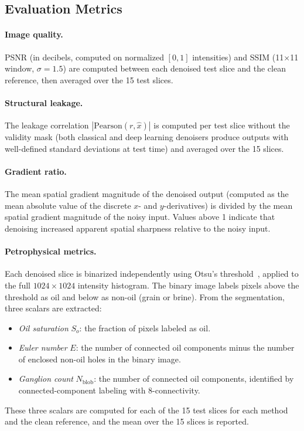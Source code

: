 \documentclass[review,12pt]{elsarticle}
\begin{document}
\subsection{Evaluation Metrics}
\label{sec:methods:eval}

\paragraph{Image quality.}
PSNR (in decibels, computed on normalized $[0, 1]$ intensities) and
SSIM (11$\times$11 window, $\sigma = 1.5$) are computed between each
denoised test slice and the clean reference, then averaged over the 15
test slices.

\paragraph{Structural leakage.}
The leakage correlation $|\mathrm{Pearson}(r, \hat{x})|$ is computed
per test slice without the validity mask (both classical and deep
learning denoisers produce outputs with well-defined standard deviations
at test time) and averaged over the 15 slices.

\paragraph{Gradient ratio.}
The mean spatial gradient magnitude of the denoised output (computed as
the mean absolute value of the discrete $x$- and $y$-derivatives) is
divided by the mean spatial gradient magnitude of the noisy input.
Values above 1 indicate that denoising increased apparent spatial
sharpness relative to the noisy input.

\paragraph{Petrophysical metrics.}
Each denoised slice is binarized independently using Otsu's
threshold~\cite{Otsu1979}, applied to the full $1024 \times 1024$
intensity histogram.  The binary image labels pixels above the threshold
as oil and below as non-oil (grain or brine).  From the segmentation,
three scalars are extracted:
\begin{itemize}
  \item \textit{Oil saturation} $S_o$: the fraction of pixels labeled
        as oil.
  \item \textit{Euler number} $E$: the number of connected oil
        components minus the number of enclosed non-oil holes in the
        binary image.
  \item \textit{Ganglion count} $N_{\mathrm{blob}}$: the number of
        connected oil components, identified by connected-component
        labeling with 8-connectivity.
\end{itemize}
These three scalars are computed for each of the 15 test slices for
each method and the clean reference, and the mean over the 15 slices
is reported.
\end{document}

